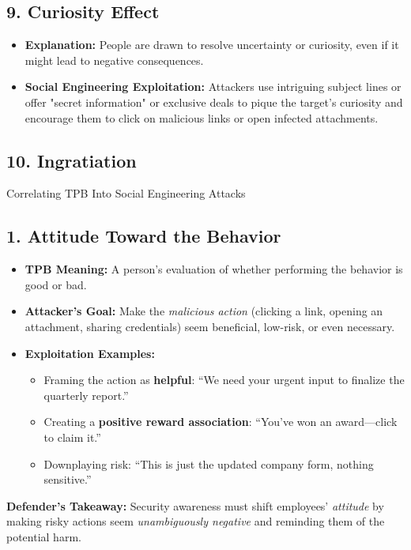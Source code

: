 \subsection{9. Curiosity Effect}
\begin{itemize}
    \item \textbf{Explanation:} People are drawn to resolve uncertainty or curiosity, even if it might lead to negative consequences.
    \item \textbf{Social Engineering Exploitation:} Attackers use intriguing subject lines or offer "secret information" or exclusive deals to pique the target's curiosity and encourage them to click on malicious links or open infected attachments. 
\end{itemize}

\subsection{10. Ingratiation}

Correlating TPB Into Social Engineering Attacks

\subsection{\textbf{1. Attitude Toward the Behavior}}

\begin{itemize}
    \item \textbf{TPB Meaning:} A person’s evaluation of whether performing the behavior is good or bad.
    \item \textbf{Attacker’s Goal:} Make the \textit{malicious action} (clicking a link, opening an attachment, sharing credentials) seem beneficial, low-risk, or even necessary.
    \item \textbf{Exploitation Examples:}
    \begin{itemize}
        \item Framing the action as \textbf{helpful}: “We need your urgent input to finalize the quarterly report.”
        \item Creating a \textbf{positive reward association}: “You’ve won an award—click to claim it.”
        \item Downplaying risk: “This is just the updated company form, nothing sensitive.”
    \end{itemize}
\end{itemize}
\textbf{Defender’s Takeaway:} Security awareness must shift employees’ \textit{attitude} by making risky actions seem \textit{unambiguously negative} and reminding them of the potential harm.

